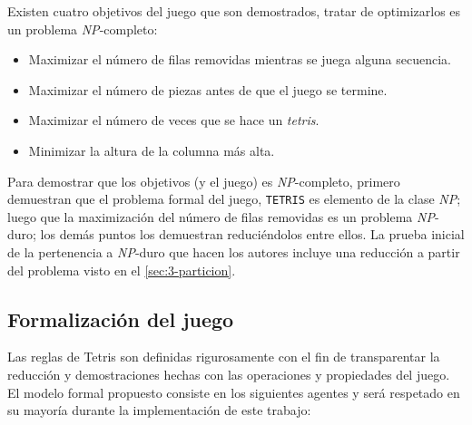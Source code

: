 Existen cuatro objetivos del juego que son demostrados, tratar de optimizarlos
es un problema \textsl{NP}-completo:

\begin{itemize}

\item Maximizar el número de filas removidas mientras se juega alguna secuencia.

\item Maximizar el número de piezas antes de que el juego se termine.

\item Maximizar el número de veces que se hace un \textit{tetris}.

\item Minimizar la altura de la columna más alta.
\end{itemize}

Para demostrar que los objetivos (y el juego) es \textsl{NP}-completo, primero
demuestran que el problema formal del juego, \texttt{TETRIS} es elemento de 
la clase \textsl{NP}; luego que la maximización
 del número de filas removidas es un problema
\textsl{NP}-duro; los demás puntos los demuestran reduciéndolos entre ellos.
La prueba inicial de la pertenencia a \textsl{NP}-duro que hacen los
autores incluye una reducción a partir del problema visto en el
\cref{sec:3-particion}.

\subsection{Formalización del juego}
\label{subsec:formalizacion}

Las reglas de Tetris son definidas rigurosamente con el fin de transparentar
la reducción y demostraciones hechas con las operaciones y propiedades del
juego. El modelo formal propuesto consiste en los siguientes
agentes y será respetado en su mayoría durante la implementación de este trabajo:

